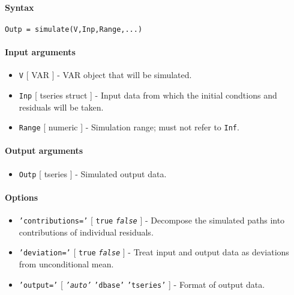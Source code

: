 


	\paragraph{Syntax}\label{syntax}

\begin{verbatim}
Outp = simulate(V,Inp,Range,...)
\end{verbatim}

\paragraph{Input arguments}\label{input-arguments}

\begin{itemize}
\item
  \texttt{V} {[} VAR {]} - VAR object that will be simulated.
\item
  \texttt{Inp} {[} tseries \textbar{} struct {]} - Input data from which
  the initial condtions and residuals will be taken.
\item
  \texttt{Range} {[} numeric {]} - Simulation range; must not refer to
  \texttt{Inf}.
\end{itemize}

\paragraph{Output arguments}\label{output-arguments}

\begin{itemize}
\itemsep1pt\parskip0pt
\item
  \texttt{Outp} {[} tseries {]} - Simulated output data.
\end{itemize}

\paragraph{Options}\label{options}

\begin{itemize}
\item
  \texttt{'contributions='} {[} \texttt{true} \textbar{}
  \emph{\texttt{false}} {]} - Decompose the simulated paths into
  contributions of individual residuals.
\item
  \texttt{'deviation='} {[} \texttt{true} \textbar{}
  \emph{\texttt{false}} {]} - Treat input and output data as deviations
  from unconditional mean.
\item
  \texttt{'output='} {[} \emph{\texttt{'auto'}} \textbar{}
  \texttt{'dbase'} \textbar{} \texttt{'tseries'} {]} - Format of output
  data.
\end{itemize}


